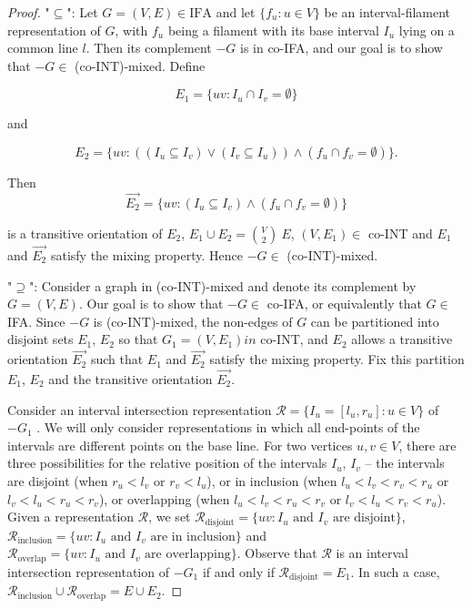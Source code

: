 \begin{proof}
	"$\subseteq$": Let $G = (V, E) \in \text{IFA}$ and let $\{f_u : u \in V\}$ be an interval-filament representation of $G$, with $f_u$ being a filament with its base interval $I_u$ lying on a common line $l$. Then its complement $-G$ is in co-IFA, and our goal is to show that $-G \in$ (co-INT)-mixed. Define
	
	$$
	E_1 = \{uv : I_u \cap I_v = \emptyset\}
	$$
	
	and
	
	$$
	E_2 = \{uv : ((I_u \subseteq I_v ) \lor (I_v \subseteq I_u )) \land (f_u \cap f_v = \emptyset)\}.
	$$
	
	Then
	$$
	\overrightarrow{E_2} = \{uv : (I_u \subseteq I_v ) \land (f_u \cap f_v = \emptyset)\}
	$$
	
	is a transitive orientation of $E_2$, $E_1 \cup E_2 = \binom{V}{2} \ E$, $(V, E_1) \in$ co-INT and $E_1$ and $\overrightarrow{E_2}$ satisfy the mixing property. Hence $-G \in$ (co-INT)-mixed.
	
	"$\supseteq$": Consider a graph in (co-INT)-mixed and denote its complement by $G = (V, E)$. Our goal is to show that $-G \in$ co-IFA, or equivalently that $G \in$ IFA. Since $-G$ is (co-INT)-mixed, the non-edges of $G$ can be partitioned into disjoint sets $E_1$, $E_2$ so that $G_1 = (V, E_1) in$ co-INT, and $E_2$ allows a transitive orientation $\overrightarrow{E_2}$ such that $E_1$ and $\overrightarrow{E_2}$ satisfy the mixing property. Fix this partition $E_1$, $E_2$ and the transitive orientation $\overrightarrow{E_2}$.
	
	Consider an interval intersection representation $\mathcal{R} = \{I_u = [l_u , r_u] : u \in V\}$ of $-G_1$ . We will only consider representations in which all end-points of the intervals are different points on the base line. For two vertices $u, v \in V$, there are three possibilities for the relative position of the intervals $I_u$, $I_v$ -- the intervals are disjoint (when $r_u < l_v$ or $r_v < l_u$), or in inclusion (when $l_u < l_v < r_v < r_u$ or $l_v <
	l_u < r_u < r_v$), or overlapping (when $l_u < l_v < r_u < r_v$ or $l_v < l_u < r_v < r_u$). Given a representation	$\mathcal{R}$, we set $\mathcal{R}_{\text{disjoint}} = \{uv : I_u \text{ and } I_v \text{ are disjoint}\}$, $\mathcal{R}_{\text{inclusion}} = \{uv : I_u \text{ and } I_v \text{ are in inclusion}\}$ and $\mathcal{R}_{\text{overlap}} = \{uv : I_u \text{ and } I_v \text{ are overlapping}\}$. Observe that $\mathcal{R}$ is an interval intersection representation of $-G_1$ if and only if $\mathcal{R}_{\text{disjoint}} = E_1$. In such a case, $\mathcal{R}_{\text{inclusion}} \cup \mathcal{R}_{\text{overlap}} = E \cup E_2$.
	

\end{proof}
